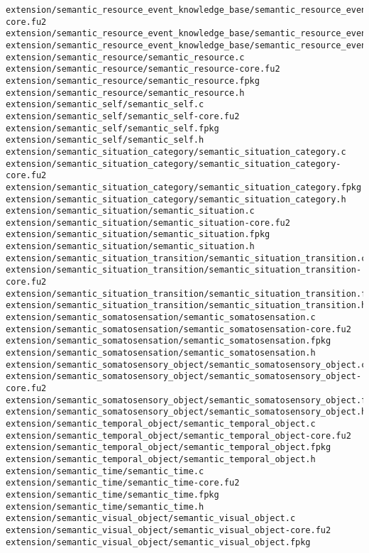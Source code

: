 \begin{lstlisting}
extension/semantic_resource_event_knowledge_base/semantic_resource_event_knowledge_base-core.fu2
extension/semantic_resource_event_knowledge_base/semantic_resource_event_knowledge_base.fpkg
extension/semantic_resource_event_knowledge_base/semantic_resource_event_knowledge_base.h
extension/semantic_resource/semantic_resource.c
extension/semantic_resource/semantic_resource-core.fu2
extension/semantic_resource/semantic_resource.fpkg
extension/semantic_resource/semantic_resource.h
extension/semantic_self/semantic_self.c
extension/semantic_self/semantic_self-core.fu2
extension/semantic_self/semantic_self.fpkg
extension/semantic_self/semantic_self.h
extension/semantic_situation_category/semantic_situation_category.c
extension/semantic_situation_category/semantic_situation_category-core.fu2
extension/semantic_situation_category/semantic_situation_category.fpkg
extension/semantic_situation_category/semantic_situation_category.h
extension/semantic_situation/semantic_situation.c
extension/semantic_situation/semantic_situation-core.fu2
extension/semantic_situation/semantic_situation.fpkg
extension/semantic_situation/semantic_situation.h
extension/semantic_situation_transition/semantic_situation_transition.c
extension/semantic_situation_transition/semantic_situation_transition-core.fu2
extension/semantic_situation_transition/semantic_situation_transition.fpkg
extension/semantic_situation_transition/semantic_situation_transition.h
extension/semantic_somatosensation/semantic_somatosensation.c
extension/semantic_somatosensation/semantic_somatosensation-core.fu2
extension/semantic_somatosensation/semantic_somatosensation.fpkg
extension/semantic_somatosensation/semantic_somatosensation.h
extension/semantic_somatosensory_object/semantic_somatosensory_object.c
extension/semantic_somatosensory_object/semantic_somatosensory_object-core.fu2
extension/semantic_somatosensory_object/semantic_somatosensory_object.fpkg
extension/semantic_somatosensory_object/semantic_somatosensory_object.h
extension/semantic_temporal_object/semantic_temporal_object.c
extension/semantic_temporal_object/semantic_temporal_object-core.fu2
extension/semantic_temporal_object/semantic_temporal_object.fpkg
extension/semantic_temporal_object/semantic_temporal_object.h
extension/semantic_time/semantic_time.c
extension/semantic_time/semantic_time-core.fu2
extension/semantic_time/semantic_time.fpkg
extension/semantic_time/semantic_time.h
extension/semantic_visual_object/semantic_visual_object.c
extension/semantic_visual_object/semantic_visual_object-core.fu2
extension/semantic_visual_object/semantic_visual_object.fpkg

\end{lstlisting}
